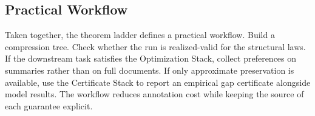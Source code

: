 \subsection{Practical Workflow}

Taken together, the theorem ladder defines a practical workflow. Build a compression tree. Check whether the run is realized-valid for the structural laws. If the downstream task satisfies the Optimization Stack, collect preferences on summaries rather than on full documents. If only approximate preservation is available, use the Certificate Stack to report an empirical gap certificate alongside model results. The workflow reduces annotation cost while keeping the source of each guarantee explicit.
